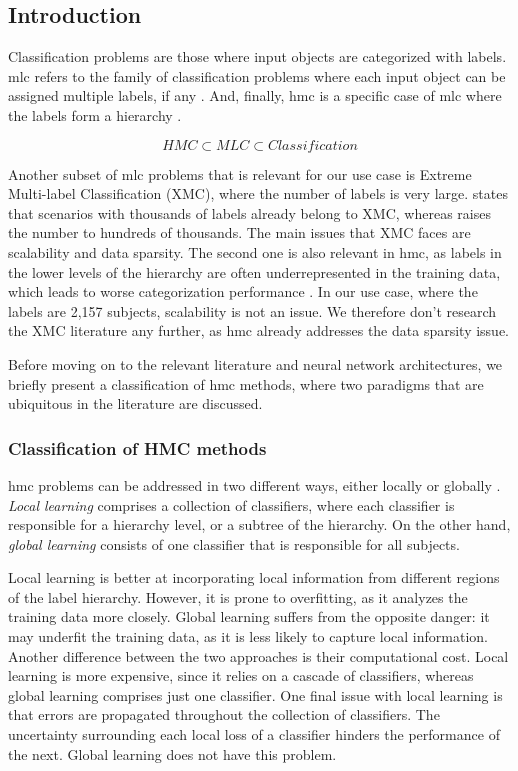 \subsection{Introduction} \label{hmc_intro}

Classification problems are those where input objects are categorized with labels. \acrfull{mlc} refers to the family of classification problems where each input object can be assigned multiple labels, if any \cite{gargiulo2019deep}. And, finally, \acrfull{hmc} is a specific case of \acrfull{mlc} where the labels form a hierarchy \cite{wehrmann2018hierarchical}.

$$ HMC \subset MLC \subset Classification $$

Another subset of \acrshort{mlc} problems that is relevant for our use case is Extreme Multi-label Classification (XMC), where the number of labels is very large. \cite{gargiulo2019deep} states that scenarios with thousands of labels already belong to XMC, whereas \cite{liu2017deep} raises the number to hundreds of thousands. The main issues that XMC faces are scalability and data sparsity. The second one is also relevant in \acrshort{hmc}, as labels in the lower levels of the hierarchy are often underrepresented in the training data, which leads to worse categorization performance \cite{shimura2018hft}. In our use case, where the labels are 2,157 subjects, scalability is not an issue. We therefore don't research the XMC literature any further, as \acrshort{hmc} already addresses the data sparsity issue.

Before moving on to the relevant literature and neural network architectures, we briefly present a classification of \acrshort{hmc} methods, where two paradigms that are ubiquitous in the literature are discussed.

\subsubsection{Classification of HMC methods}

\acrshort{hmc} problems can be addressed in two different ways, either locally or globally \cite{wehrmann2018hierarchical}. \textit{Local learning} comprises a collection of classifiers, where each classifier is responsible for a hierarchy level, or a subtree of the hierarchy. On the other hand, \textit{global learning} consists of one classifier that is responsible for all subjects.

Local learning is better at incorporating local information from different regions of the label hierarchy. However, it is prone to overfitting, as it analyzes the training data more closely. Global learning suffers from the opposite danger: it may underfit the training data, as it is less likely to capture local information. Another difference between the two approaches is their computational cost. Local learning is more expensive, since it relies on a cascade of classifiers, whereas global learning comprises just one classifier. One final issue with local learning is that errors are propagated throughout the collection of classifiers. The uncertainty surrounding each local loss of a classifier hinders the performance of the next. Global learning does not have this problem.